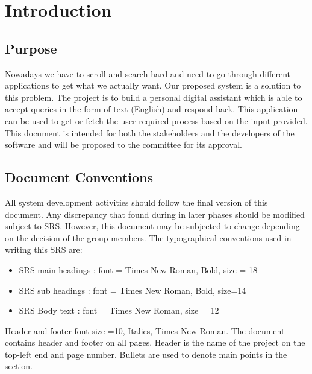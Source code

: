 \section{Introduction}
\subsection*{Purpose}
Nowadays we have to scroll and search hard and need to go through different applications to get what we actually want.  Our proposed system is a solution to this problem.  The project is to build a personal digital assistant which is able to accept queries in the form of text (English) and respond back.  This application can be used to get or fetch the user required process based on the input provided.  This document is intended for both the stakeholders and the developers of the software and will be proposed to the committee for its approval.

\subsection*{Document Conventions}
All system development activities should follow the final version of this document.  Any discrepancy that found during in later phases should be modified subject to SRS.  However, this document may be subjected to change depending on the decision of the group members.
\newline
The typographical conventions used in writing this SRS are:
\begin{itemize}
\item SRS main headings : font = Times New Roman, Bold, size = 18
\item SRS sub headings  : font = Times New Roman, Bold, size=14
\item SRS Body text     : font = Times New Roman, size = 12
\end{itemize}
Header and footer font size =10,  Italics, Times New Roman.  The document contains header and footer on all pages.  Header is the name of the project on the top-left end and page number.
Bullets are used to denote main points in the section.
